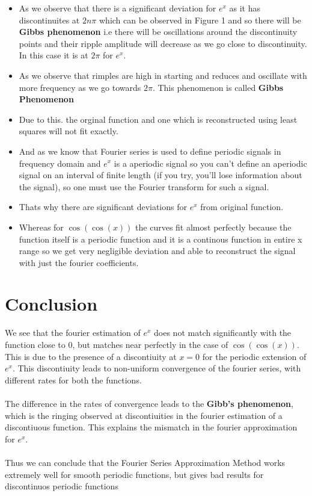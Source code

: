 \documentclass[11pt, a4paper]{article}
\begin{document}
\begin{itemize}

\item
  As we observe that there is a significant deviation for \(e^{x}\) as
  it has discontinuites at \(2n\pi\) which can be observed in Figure 1
  and so there will be \textbf{Gibbs phenomenon} i.e there will be
  oscillations around the discontinuity points and their ripple
  amplitude will decrease as we go close to discontinuity. In this case
  it is at \(2\pi\) for \(e^{x}\).
\item
  As we observe that rimples are high in starting and reduces and
  oscillate with more frequency as we go towards \(2\pi\). This
  phenomenon is called \textbf{Gibbs Phenomenon}
\item
  Due to this. the orginal function and one which is reconstructed using
  least squares will not fit exactly.
\item
  And as we know that Fourier series is used to define periodic signals
  in frequency domain and \(e^{x}\) is a aperiodic signal so you can't
  define an aperiodic signal on an interval of finite length (if you
  try, you'll lose information about the signal), so one must use the
  Fourier transform for such a signal.
\item
  Thats why there are significant deviations for \(e^{x}\) from original
  function.
\item
  Whereas for \(\cos(\cos(x))\) the curves fit almost perfectly because
  the function itself is a periodic function and it is a continous
  function in entire x range so we get very negligible deviation and
  able to reconstruct the signal with just the fourier coefficients.
\end{itemize}
\section{Conclusion}
We see that the fourier estimation of \(e^x\) does not match
significantly with the function close to \(0\), but matches near
perfectly in the case of \(\cos(\cos(x))\). This is due to the
presence of a discontiuity at \(x=0\) for the periodic extension of
\(e^x\). This discontiuity leads to non-uniform convergence of the
fourier series, with different rates for both the functions.\\\\
The difference in the rates of convergence leads to the \textbf{Gibb's
phenomenon}, which is the ringing observed at discontiuities in the
fourier estimation of a discontiuous function. 
This explains the mismatch in the fourier approximation for \(e^x\).
\\\\
Thus we can conclude that the Fourier Series Approximation Method works extremely well
for smooth periodic functions, but gives bad results for discontinuos periodic functions
\end{document}
